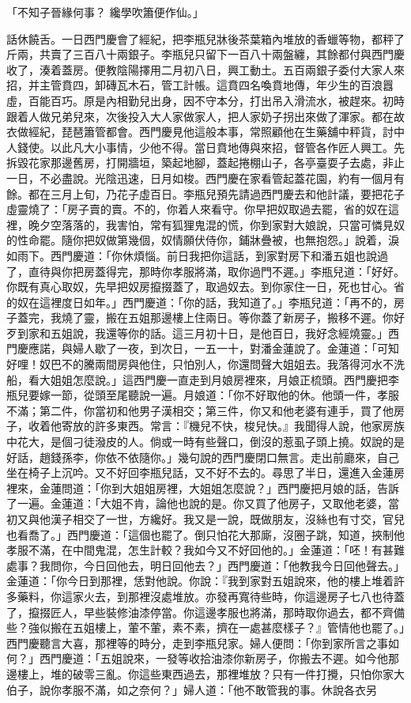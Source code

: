 \begin{showcontents}{}
「不知子晉緣何事？  纔學吹簫便作仙。」

話休饒舌。一日西門慶會了經紀，把李瓶兒牀後茶葉箱內堆放的香蠟等物，都秤了斤兩，共賣了三百八十兩銀子。李瓶兒只留下一百八十兩盤纏，其餘都付與西門慶收了，湊着蓋房。便教陰陽擇用二月初八日，興工動土。五百兩銀子委付大家人來招，并主管賁四，卸磚瓦木石，管工計帳。這賁四名喚賁地傳，年少生的百浪囂虛，百能百巧。原是內相勤兒出身，因不守本分，打出吊入滑流水，被趕來。初時跟着人做兄弟兒來，次後投入大人家做家人，把人家奶子拐出來做了渾家。都在故衣做經紀，琵琶簫管都會。西門慶見他這般本事，常照顧他在生藥舖中秤貨，討中人錢使。以此凡大小事情，少他不得。當日賁地傳與來招，督管各作匠人興工。先拆毀花家那邊舊房，打開牆垣，築起地腳，蓋起捲棚山子，各亭臺耍子去處，非止一日，不必盡說。光陰迅速，日月如梭。西門慶在家看管起蓋花園，約有一個月有餘。都在三月上旬，乃花子虛百日。李瓶兒預先請過西門慶去和他計議，要把花子虛靈燒了：「房子賣的賣。不的，你着人來看守。你早把奴取過去罷，省的奴在這裡，晚夕空落落的，我害怕，常有狐狸鬼混的慌，你到家對大娘說，只當可憐見奴的性命罷。隨你把奴做第幾個，奴情願伏侍你，鋪牀疊被，也無抱怨。」說着，淚如雨下。西門慶道：「你休煩惱。前日我把你這話，到家對房下和潘五姐也說過了，直待與你把房蓋得完，那時你孝服將滿，取你過門不遲。」李瓶兒道：「好好。你既有真心取奴，先早把奴房攛掇蓋了，取過奴去。到你家住一日，死也甘心。省的奴在這裡度日如年。」西門慶道：「你的話，我知道了。」李瓶兒道：「再不的，房子蓋完，我燒了靈，搬在五姐那邊樓上住兩日。等你蓋了新房子，搬移不遲。你好歹到家和五姐說，我還等你的話。這三月初十日，是他百日，我好念經燒靈。」西門慶應諾，與婦人歇了一夜，到次日，一五一十，對潘金蓮說了。金蓮道：「可知好哩！奴巴不的騰兩間房與他住，只怕別人，你還問聲大姐姐去。我落得河水不洗船，看大姐姐怎麼說。」這西門慶一直走到月娘房裡來，月娘正梳頭。西門慶把李瓶兒要嫁一節，從頭至尾聽說一遍。月娘道：「你不好取他的休。他頭一件，孝服不滿；第二件，你當初和他男子漢相交；第三件，你又和他老婆有連手，買了他房子，收着他寄放的許多東西。常言：『機兒不快，梭兒快。』我聞得人說，他家房族中花大，是個刁徒潑皮的人。倘或一時有些聲口，倒沒的惹虱子頭上撓。奴說的是好話，趙錢孫李，你依不依隨你。」幾句說的西門慶閉口無言。走出前廳來，自己坐在椅子上沉吟。又不好回李瓶兒話，又不好不去的。尋思了半日，還進入金蓮房裡來，金蓮問道：「你到大姐姐房裡，大姐姐怎麼說？」西門慶把月娘的話，告訴了一遍。金蓮道：「大姐不肯，論他也說的是。你又買了他房子，又取他老婆，當初又與他漢子相交了一世，方纔好。我又是一說，既做朋友，沒絲也有寸交，官兒也看喬了。」西門慶道：「這個也罷了。倒只怕花大那廝，沒圈子跳，知道，挾制他孝服不滿，在中間鬼混，怎生計較？我如今又不好回他的。」金蓮道：「呸！有甚難處事？我問你，今日回他去，明日回他去？」西門慶道：「他教我今日回他聲去。」金蓮道：「你今日到那裡，恁對他說。你說：『我到家對五姐說來，他的樓上堆着許多藥料，你這家火去，到那裡沒處堆放。亦發再寬待些時，你這邊房子七八也待蓋了，攛掇匠人，早些裝修油漆停當。你這邊孝服也將滿，那時取你過去，都不齊備些？強似搬在五姐樓上，葷不葷，素不素，擠在一處甚麼樣子？』管情他也罷了。」西門慶聽言大喜，那裡等的時分，走到李瓶兒家。婦人便問：「你到家所言之事如何？」西門慶道：「五姐說來，一發等收拾油漆你新房子，你搬去不遲。如今他那邊樓上，堆的破零三亂。你這些東西過去，那裡堆放？只有一件打攪，只怕你家大伯子，說你孝服不滿，如之奈何？」婦人道：「他不敢管我的事。休說各衣另
\end{showcontents}

